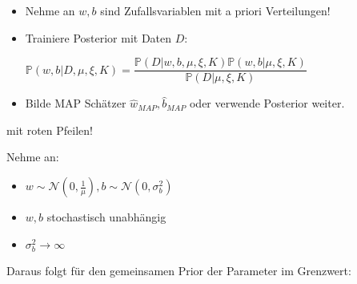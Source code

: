 \documentclass{beamer}
\begin{document}
{\begin{frame}
\begin{itemize}
	\item Nehme an $w, b$ sind Zufallsvariablen mit a priori Verteilungen!
	\item Trainiere Posterior mit Daten $D$:
		\begin{center}
				$\mathbb{P}(w,b\vert D,\mu,\xi,K) = \dfrac{\mathbb{P}(D\vert w,b, \mu,						\xi,K)\mathbb{P}(w,b\vert \mu,\xi , K)}{\mathbb{P}(D\vert \mu,\xi,K)}$
		\end{center}
	\item Bilde MAP Schätzer $\hat{w}_{MAP}, \hat{b}_{MAP}$ oder verwende Posterior 				  weiter.
\end{itemize}	
\end{frame}

\begin{frame}
	mit roten Pfeilen!
\end{frame}

\begin{frame}

Nehme an:
\begin{itemize}
	\item $w \sim \mathcal{N}(0,\frac{1}{\mu}), b \sim \mathcal{N}(0,\sigma^2_b)$
	\item $w,b$ stochastisch unabhängig 
	\item $\sigma^2_b \rightarrow \infty$
\end{itemize}

Daraus folgt für den gemeinsamen Prior der Parameter im Grenzwert:


\end{frame}}
\end{document}
